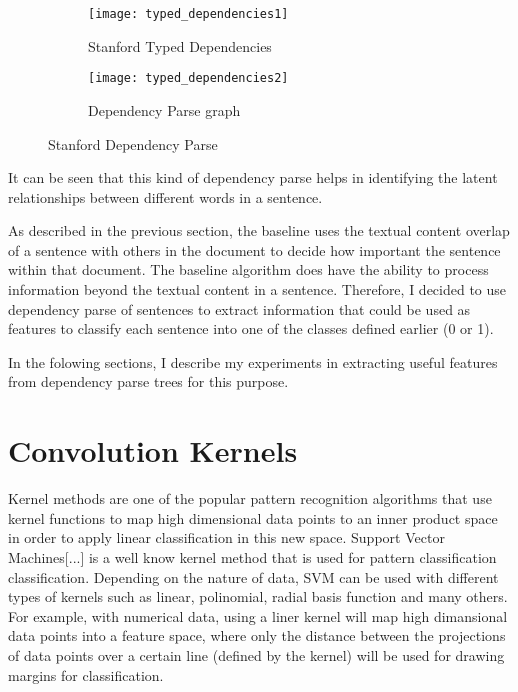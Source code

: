 \begin{figure}[h]
\begin{subfigure}{0.5\textwidth}
\texttt{[image: typed\_dependencies1]} 
\caption{Stanford Typed Dependencies}
\label{fig:typed-dep}
\end{subfigure}
\begin{subfigure}{0.5\textwidth}
\texttt{[image: typed\_dependencies2]}
\caption{Dependency Parse graph}
\label{fig:dep-parse}
\end{subfigure}
 
\caption{Stanford Dependency Parse}
\label{fig:stanford-dep-parse}
\end{figure}

It can be seen that this kind of dependency parse helps in identifying the latent relationships between different words in a sentence.

As described in the previous section, the baseline uses the textual content overlap of a sentence with others in the document to decide how important the sentence within that document.
The baseline algorithm does have the ability to process information beyond the textual content in a sentence.
Therefore, I decided to use dependency parse of sentences to extract information that could be used as features to classify each sentence into one of the classes defined earlier (0 or 1).

In the folowing sections, I describe my experiments in extracting useful features from dependency parse trees for this purpose.

\section{Convolution Kernels}
Kernel methods are one of the popular pattern recognition algorithms that use kernel functions to map high dimensional data points to an inner product space in order to apply linear classification in this new space.
Support Vector Machines[...] is a well know kernel method that is used for pattern classification classification.
Depending on the nature of data, SVM can be used with different types of kernels such as linear, polinomial, radial basis function and many others.
For example, with numerical data, using a liner kernel will map high dimansional data points into a feature space, where only the distance between the projections of data points over a certain line (defined by the kernel) will be used for drawing margins for classification.

